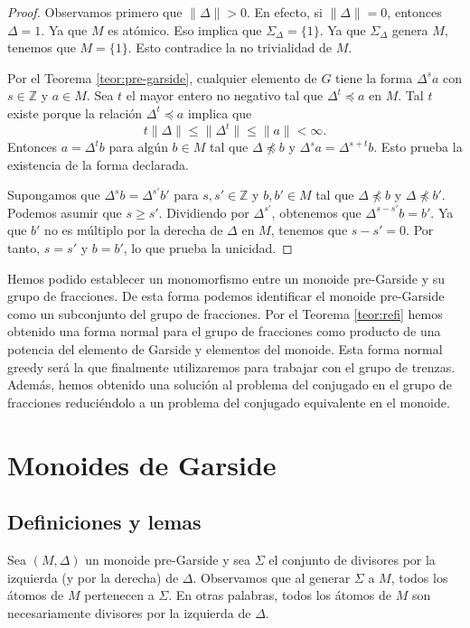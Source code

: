 \documentclass[12pt]{book}
\theoremstyle{definition}
\providecommand{\norm}[1]{\lVert#1\rVert}
\begin{document}
\begin{proof} Observamos primero que $\norm{\Delta}>0$. En efecto, si $\norm{\Delta}= 0$, entonces $\Delta=1$. Ya que $M$ es atómico. Eso implica que $\Sigma_\Delta=\{1\}$. Ya que $\Sigma_\Delta$ genera $M$, tenemos que $M=\{1\}$. Esto contradice la no trivialidad de $M$.

Por el Teorema \ref{teor:pre-garside}, cualquier elemento de $G$ tiene la forma $\Delta^sa$ con $s\in\mathbb{Z}$ y $a\in M$. Sea $t$ el mayor entero no negativo tal que $\Delta^t\preceq a$ en $M$. Tal $t$ existe porque la relación $\Delta^t\preceq a$ implica que
$$t\norm{\Delta}\leq \norm{\Delta^t}\leq \norm{a}<\infty.$$
Entonces $a=\Delta^t b$ para algún $b\in M$ tal que $\Delta\npreceq b$ y $\Delta^s a=\Delta^{s+t} b$. Esto prueba la existencia de la forma declarada.

Supongamos que $\Delta^s b=\Delta^{s'}b'$ para $s,s'\in\mathbb{Z}$ y $b,b'\in M$ tal que $\Delta\npreceq b$ y $\Delta\npreceq b'$. Podemos asumir que $s\geq s'$. Dividiendo por $\Delta^{s'}$, obtenemos que $\Delta^{s-s'}b=b'$. Ya que $b'$ no es múltiplo por la derecha de $\Delta$ en $M$, tenemos que $s-s'=0$. Por tanto, $s=s'$ y $b=b'$, lo que prueba la unicidad.
\end{proof}

Hemos podido establecer un monomorfismo entre un monoide pre-Garside y su grupo de fracciones. De esta forma podemos identificar el monoide pre-Garside como un subconjunto del grupo de fracciones. Por el Teorema \ref{teor:refi} hemos obtenido una forma normal para el grupo de fracciones como producto de una potencia del elemento de Garside y elementos del monoide. Esta forma normal greedy será la que finalmente utilizaremos para trabajar con el grupo de trenzas. Además, hemos obtenido una solución al problema del conjugado en el grupo de fracciones reduciéndolo a un problema del conjugado equivalente en el monoide.

\section{Monoides de Garside}
\subsection{Definiciones y lemas}

Sea $(M,\Delta)$ un monoide pre-Garside y sea $\Sigma$ el conjunto de divisores por la izquierda (y por la derecha) de $\Delta$. Observamos que al generar $\Sigma$ a $M$, todos los átomos de $M$ pertenecen a $\Sigma$. En otras palabras, todos los átomos de $M$ son necesariamente divisores por la izquierda de $\Delta$.
\end{document}
